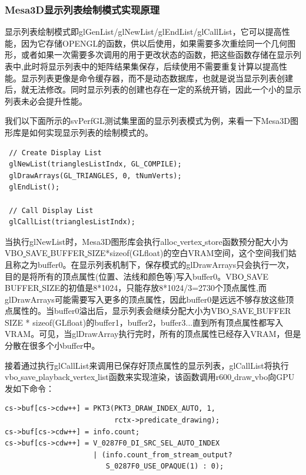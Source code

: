 \subsubsection{Mesa3D显示列表绘制模式实现原理}
\label{sec:display-list}

显示列表绘制模式即glGenList/glNewList/glEndList/glCallList，它可以提高性能，因为它存储OPENGL的函数，供以后使用，如果需要多次重绘同一个几何图形，或者如果一次需要多次调用的用于更改状态的函数，把这些函数存储在显示列表中,此时将显示列表中的矩阵结果集保存，后续使用不需要重复计算以提高性能。显示列表更像是命令缓存器，而不是动态数据库，也就是说当显示列表创建后，就无法修改。同时显示列表的创建也存在一定的系统开销，因此一个小的显示列表未必会提升性能。

我们以下面所示的svPerfGL测试集里面的显示列表模式为例，来看一下Mesa3D图形库是如何实现显示列表的绘制模式的。

\begin{lstlisting}
 // Create Display List
 glNewList(trianglesListIndx, GL_COMPILE);
 glDrawArrays(GL_TRIANGLES, 0, tNumVerts);
 glEndList(); 

 // Call Display List
 glCallList(trianglesListIndx);
\end{lstlisting}


当执行glNewList时，Mesa3D图形库会执行alloc\underline{ }vertex\underline{ }store函数预分配大小为VBO\underline{ }SAVE\underline{ }BUFFER\underline{ }SIZE*sizeof(GLfloat)的空白VRAM空间，这个空间我们姑且称之为buffer0。在显示列表机制下，保存模式的glDrawArrays只会执行一次，目的是将所有的顶点属性(位置、法线和颜色等)写入buffer0。VBO\underline{ }SAVE\underline{ }BUFFER\underline{ }SIZE的初值是8*1024，只能存放8*1024/3=2730个顶点属性,而glDrawArrays可能需要写入更多的顶点属性，因此buffer0是远远不够存放这些顶点属性的。当buffer0溢出后，显示列表会继续分配大小为VBO\underline{ }SAVE\underline{ }BUFFER\underline{ }SIZE * sizeof(GLfloat)的buffer1，buffer2，buffer3...直到所有顶点属性都写入VRAM。可见，当glDrawArray执行完时，所有的顶点属性已经存入VRAM，但是分散在很多个小buffer中。

接着通过执行glCallList来调用已保存好顶点属性的显示列表，glCallList将执行vbo\underline{ }save\underline{ }playback\underline{ }vertex\underline{ }list函数来实现渲染，该函数调用r600\underline{ }draw\underline{ }vbo向GPU发如下命令：

\begin{lstlisting}
cs->buf[cs->cdw++] = PKT3(PKT3_DRAW_INDEX_AUTO, 1, 
                          rctx->predicate_drawing);
cs->buf[cs->cdw++] = info.count;
cs->buf[cs->cdw++] = V_0287F0_DI_SRC_SEL_AUTO_INDEX 
                     | (info.count_from_stream_output? 
                        S_0287F0_USE_OPAQUE(1) : 0);
\end{lstlisting}

